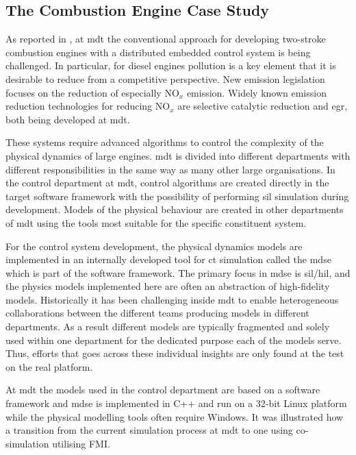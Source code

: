 \subsection{The Combustion Engine Case Study}

As reported in \cite{Pedersen&17}, at \ac{mdt} the conventional approach for
developing two-stroke combustion engines with a distributed embedded control
system is being challenged. In particular, for diesel engines pollution is a
key element that it is desirable to reduce from a competitive perspective. New
emission legislation focuses on the reduction of especially NO$_x$ emission.
Widely known emission reduction technologies for reducing NO$_x$ are selective
catalytic reduction and \ac{egr}, both being developed at \ac{mdt}.

These systems require advanced algorithms to control the complexity of the
physical dynamics of large engines. \ac{mdt} is divided into different
departments with different responsibilities in the same way as many other large
organisations. In the control department at \ac{mdt}, control algorithms are
created directly in the target software framework with the possibility of
performing \ac{sil} simulation during development.  Models of the physical
behaviour are created in other departments of \ac{mdt} using the tools most
suitable for the specific constituent system.

For the control system development, the physical dynamics models are
implemented in an internally developed tool for \ac{ct} simulation called the
\ac{mdse} which is part of the software framework. The primary focus in
\ac{mdse} is \ac{sil}/\ac{hil}, and the physics models implemented here are
often an abstraction of high-fidelity models. Historically it has been
challenging inside \ac{mdt} to enable heterogeneous collaborations between the
different teams producing models in different departments. As a result
different models are typically fragmented and solely used within one department
for the dedicated purpose each of the models serve. Thus, efforts that goes
across these individual insights are only found at the test on the real
platform.


At \ac{mdt} the models used in the control department are based on a software
framework and \ac{mdse} is implemented in C++ and run on a 32-bit Linux
platform while the physical modelling tools often require Windows. It was illustrated how a transition from the current
simulation process at \ac{mdt} to one using co-simulation utilising FMI.

